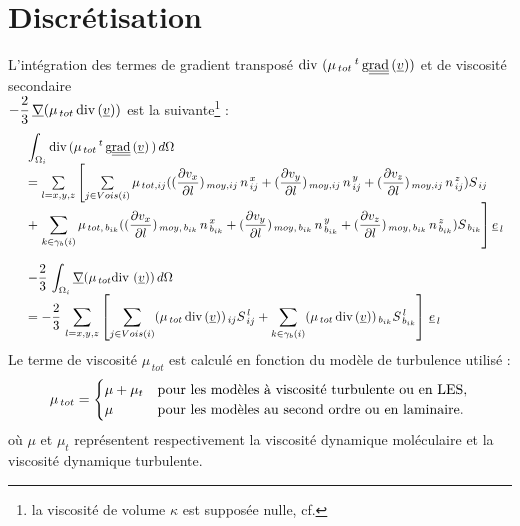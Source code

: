 \section*{Discr\'etisation}
L'intégration des termes de gradient transposé
 $\text{div}\,\,(\mu_{\,tot}\,^t\,\text{g}\underline{\underline{{\text{rad}}}}\,(\underline{v}))$ et de viscosité
secondaire \\
$-\displaystyle \frac{2}{3}\,\underline{\nabla} (\mu_{\,tot}\,\text{div}\,(\underline{v}))$ est la suivante\footnote{la viscosité de volume
$\kappa$ est supposée nulle, cf. } :
\begin{equation}\notag
\begin{array}{llll}
&\displaystyle \int_{\Omega_i}\text{div}\, (\mu_{\,tot}
\,^t\,\text{g}\underline{\underline{{\text{rad}}}}\,(\underline{v})\,)\,d\Omega \\
&= \sum\limits_{l=x,y,z}\left[ \sum\limits_{j \in
Vois(i)} \mu_{\,tot,ij} ((\displaystyle \frac {\partial v_x}{\partial
l})_{\,moy,ij}\,n_{\,ij}^{\,x} +(\frac {\partial v_y}
 {\partial l})_{\,moy,ij}\,n_{\,ij}^{\,y}+ \displaystyle(\frac {\partial v_z}
{\partial l})_{\,moy,ij}\,n_{\,ij}^{\,z}) S_{\,ij}\right.\\
&+\left.\displaystyle \sum\limits_{k \in \gamma_b(i)} \mu_{\,tot,\,b_{ik}}
((\frac {\partial v_x}{\partial l})_{\,moy,\,b_{ik}}\,n_{\,b_{ik}}^{\,x} +(\frac
{\partial v_y}{\partial l})_{\,moy,\,b_{ik}}\,n_{\,b_{ik}}^{\,y}+
\displaystyle(\frac {\partial v_z}{\partial
l})_{\,moy,\,b_{ik}}\,n_{\,b_{ik}}^{\,z}) S_{\,b_{ik}}\right] \underline
{e}_{\,l} \\\\
&-\displaystyle \frac{2}{3}\,\int_{\Omega_i}\underline{\nabla} (\mu_{\,tot} \text{div}\,\,(\underline{v}))
\,d\Omega \\
&= -\displaystyle \frac{2}{3}\,\sum\limits_{l=x,y,z}\left[\sum\limits_{j \in Vois(i)}(\mu_{\,tot}\,\text{div}\,(\underline{v}))_{\,ij} S_{\,ij}^{\,l} + \displaystyle \sum_{k \in \gamma_b(i)}(\mu_{\,tot}\,\text{div}\,(\underline{v}))_{\,b_{ik}} S_{\,b_{ik}}^{\,l}\right]\,\underline {e}_{\,l}
\end{array}
\end{equation}
Le terme de viscosité $\mu_{\,tot}$ est calculé en fonction du modèle de turbulence utilisé :
\begin{equation}\notag
\mu_{\,tot}=
\begin{cases}
\mu + \mu_t & \text{pour les modèles à viscosité turbulente ou en LES}, \\
\mu& \text{pour les modèles au second ordre ou en laminaire}.
\end{cases}
\end{equation}
où $\mu$ et $\mu_t$ repr\'esentent respectivement la viscosit\'e dynamique moléculaire et la viscosité dynamique turbulente.

